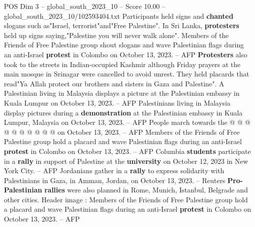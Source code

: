 \begin{textsample}{POS Dim 3 – global\_south\_2023\_10 – Score 10.00 – global\_south\_2023\_10/102593404.txt}
Participants held signs and \textbf{chanted} slogans such as"Israel, terrorist"and"Free Palestine".
In Sri Lanka, \textbf{protesters} held up signs saying,"Palestine you will never walk alone".
Members of the Friends of Free Palestine group shout slogans and wave Palestinian flags during an anti-Israel \textbf{protest} in Colombo on October 13, 2023. -- AFP \textbf{Protesters} also took to the streets in Indian-occupied Kashmir although Friday prayers at the main mosque in Srinagar were cancelled to avoid unrest.
They held placards that read"Ya Allah protect our brothers and sisters in Gaza and Palestine".
A Palestinian living in Malaysia displays a picture at the Palestinian embassy in Kuala Lumpur on October 13, 2023. -- AFP Palestinians living in Malaysia display pictures during a \textbf{demonstration} at the Palestinian embassy in Kuala Lumpur, Malaysia on October 13, 2023. -- AFP People march towards the @ @ @ @ @ @ @ @ @ @ on October 13, 2023. -- AFP Members of the Friends of Free Palestine group hold a placard and wave Palestinian flags during an anti-Israel \textbf{protest} in Colombo on October 13, 2023. -- AFP Columbia \textbf{students} participate in a \textbf{rally} in support of Palestine at the \textbf{university} on October 12, 2023 in New York City. -- AFP Jordanians gather in a \textbf{rally} to express solidarity with Palestinians in Gaza, in Amman, Jordan, on October 13, 2023. -- Reuters \textbf{Pro-Palestinian} \textbf{rallies} were also planned in Rome, Munich, Istanbul, Belgrade and other cities.
Header image : Members of the Friends of Free Palestine group hold a placard and wave Palestinian flags during an anti-Israel \textbf{protest} in Colombo on October 13, 2023. -- AFP

\end{textsample}
